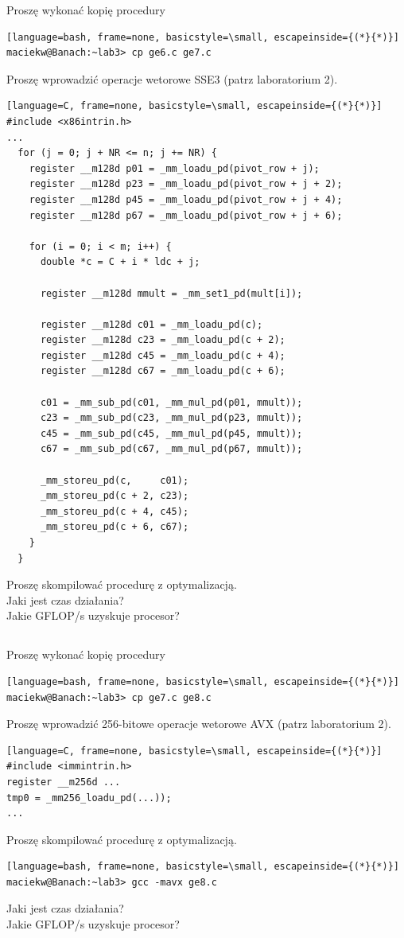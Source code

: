 \documentclass[12pt,a4paper]{article}
\begin{document}
Proszę wykonać kopię procedury
\begin{lstlisting}[language=bash, frame=none, basicstyle=\small, escapeinside={(*}{*)}]
maciekw@Banach:~lab3> cp ge6.c ge7.c
\end{lstlisting}
Proszę wprowadzić operacje wetorowe SSE3 (patrz laboratorium 2).
\begin{lstlisting}[language=C, frame=none, basicstyle=\small, escapeinside={(*}{*)}]
#include <x86intrin.h>
...
  for (j = 0; j + NR <= n; j += NR) {
    register __m128d p01 = _mm_loadu_pd(pivot_row + j);
    register __m128d p23 = _mm_loadu_pd(pivot_row + j + 2);
    register __m128d p45 = _mm_loadu_pd(pivot_row + j + 4);
    register __m128d p67 = _mm_loadu_pd(pivot_row + j + 6);

    for (i = 0; i < m; i++) {
      double *c = C + i * ldc + j;

      register __m128d mmult = _mm_set1_pd(mult[i]);

      register __m128d c01 = _mm_loadu_pd(c);
      register __m128d c23 = _mm_loadu_pd(c + 2);
      register __m128d c45 = _mm_loadu_pd(c + 4);
      register __m128d c67 = _mm_loadu_pd(c + 6);

      c01 = _mm_sub_pd(c01, _mm_mul_pd(p01, mmult));
      c23 = _mm_sub_pd(c23, _mm_mul_pd(p23, mmult));
      c45 = _mm_sub_pd(c45, _mm_mul_pd(p45, mmult));
      c67 = _mm_sub_pd(c67, _mm_mul_pd(p67, mmult));

      _mm_storeu_pd(c,     c01);
      _mm_storeu_pd(c + 2, c23);
      _mm_storeu_pd(c + 4, c45);
      _mm_storeu_pd(c + 6, c67);
    }
  }
\end{lstlisting}
Proszę skompilować procedurę z optymalizacją.\\
Jaki jest czas działania?\\
Jakie GFLOP/s uzyskuje procesor?

\subsection{}

Proszę wykonać kopię procedury
\begin{lstlisting}[language=bash, frame=none, basicstyle=\small, escapeinside={(*}{*)}]
maciekw@Banach:~lab3> cp ge7.c ge8.c
\end{lstlisting}
Proszę wprowadzić 256-bitowe operacje wetorowe AVX (patrz laboratorium 2).
\begin{lstlisting}[language=C, frame=none, basicstyle=\small, escapeinside={(*}{*)}]
#include <immintrin.h>
register __m256d ...
tmp0 = _mm256_loadu_pd(...));
...
\end{lstlisting}
Proszę skompilować procedurę z optymalizacją.
\begin{lstlisting}[language=bash, frame=none, basicstyle=\small, escapeinside={(*}{*)}]
maciekw@Banach:~lab3> gcc -mavx ge8.c
\end{lstlisting}
Jaki jest czas działania?\\
Jakie GFLOP/s uzyskuje procesor?
\end{document}
